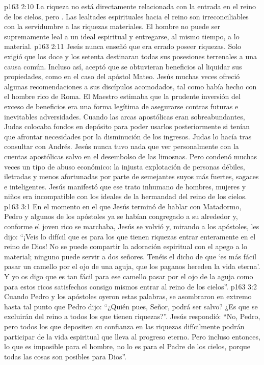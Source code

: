 \vs p163 2:10 La riqueza no está directamente relacionada con la entrada en el reino de los cielos, pero . Las lealtades espirituales hacia el reino son irreconciliables con la servidumbre a las riquezas materiales. El hombre no puede ser supremamente leal a un ideal espiritual y entregarse, al mismo tiempo, a lo material.
\vs p163 2:11 Jesús nunca enseñó que era errado poseer riquezas. Solo exigió que los doce y los setenta destinaran todas sus posesiones terrenales a una causa común. Incluso así, aceptó que se obtuvieran beneficios al liquidar sus propiedades, como en el caso del apóstol Mateo. Jesús muchas veces ofreció algunas recomendaciones a sus discípulos acomodados, tal como había hecho con el hombre rico de Roma. El Maestro estimaba que la prudente inversión del exceso de beneficios era una forma legítima de asegurarse contras futuras e inevitables adversidades. Cuando las arcas apostólicas eran sobreabundantes, Judas colocaba fondos en depósito para poder usarlos posteriormente si tenían que afrontar necesidades por la disminución de los ingresos. Judas lo hacía tras consultar con Andrés. Jesús nunca tuvo nada que ver personalmente con la cuentas apostólicas salvo en el desembolso de las limosnas. Pero condenó muchas veces un tipo de abuso económico: la injusta explotación de personas débiles, iletradas y menos afortunadas por parte de semejantes suyos más fuertes, sagaces e inteligentes. Jesús manifestó que ese trato inhumano de hombres, mujeres y niños era incompatible con los ideales de la hermandad del reino de los cielos.
\vs p163 3:1 En el momento en el que Jesús terminó de hablar con Matadormo, Pedro y algunos de los apóstoles ya se habían congregado a su alrededor y, conforme el joven rico se marchaba, Jesús se volvió y, mirando a los apóstoles, les dijo: “¡Veis lo difícil que es para los que tienen riquezas entrar enteramente en el reino de Dios! No se puede compartir la adoración espiritual con el apego a lo material; ninguno puede servir a dos señores. Tenéis el dicho de que ‘es más fácil pasar un camello por el ojo de una aguja, que los paganos hereden la vida eterna’. Y yo os digo que es tan fácil para ese camello pasar por el ojo de la aguja como para estos ricos satisfechos consigo mismos entrar al reino de los cielos”.
\vs p163 3:2 Cuando Pedro y los apóstoles oyeron estas palabras, se asombraron en extremo hasta tal punto que Pedro dijo: “¿Quién pues, Señor, podrá ser salvo? ¿Es que se excluirán del reino a todos los que tienen riquezas?”. Jesús respondió: “No, Pedro, pero todos los que depositen su confianza en las riquezas difícilmente podrán participar de la vida espiritual que lleva al progreso eterno. Pero incluso entonces, lo que es imposible para el hombre, no lo es para el Padre de los cielos, porque todas las cosas son posibles para Dios”.
